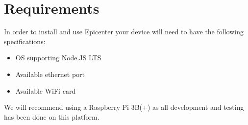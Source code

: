\section{Requirements}
In order to install and use Epicenter your device will need to have the following specifications:
\begin{itemize}
	\item OS supporting Node.JS LTS
	\item Available ethernet port
	\item Available WiFi card
\end{itemize}

We will recommend using a Raspberry Pi 3B(+) as all development and testing has been done on this platform.

